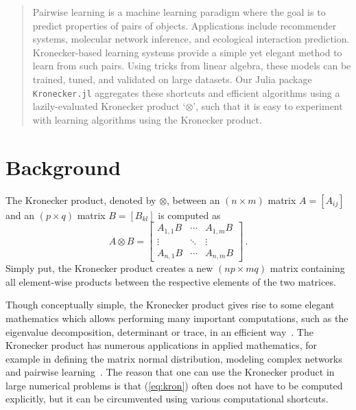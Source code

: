 \documentclass{juliacon}
\begin{document}


\maketitle

\begin{abstract}
Pairwise learning is a machine learning paradigm where the goal is to predict properties of pairs of objects.
Applications include recommender systems, molecular network inference, and ecological interaction prediction.
Kronecker-based learning systems provide a simple yet elegant method to learn from such pairs.
Using tricks from linear algebra, these models can be trained, tuned, and validated on large datasets.
Our Julia package \texttt{Kronecker.jl} aggregates these shortcuts and efficient algorithms using a lazily-evaluated Kronecker product `$\otimes$', such that it is easy to experiment with learning algorithms using the Kronecker product.

\end{abstract}

\section{Background}

The Kronecker product, denoted by $\otimes$, between an $(n\times m)$ matrix $A=[A_{ij}]$ and an $(p\times q)$ matrix $B=[B_{kl}]$ is computed as
\begin{equation}\label{eq:kron}
  {A} \otimes  {B} ={\begin{bmatrix}A_{1,1} {B} &\cdots &A_{1,m} {B} \\\vdots &\ddots &\vdots \\A_{n,1} {B} &\cdots &A_{n,m} {B} \end{bmatrix}}\,.
\end{equation}
Simply put, the Kronecker product creates a new $(np\times mq)$ matrix containing all element-wise products between the respective elements of the two matrices.

Though conceptually simple, the Kronecker product gives rise to some elegant mathematics which allows performing many important computations, such as the eigenvalue decomposition, determinant or trace, in an efficient way~\cite{Sch2013,VanLoan2000}.
The Kronecker product has numerous applications in applied mathematics, for example in defining the matrix normal distribution, modeling complex networks~\cite{Leskovec2008} and pairwise learning~\cite{Stock2017tskrr}.
The reason that one can use the Kronecker product in large numerical problems is that (\ref{eq:kron}) often does not have to be computed explicitly, but it can be circumvented using various computational shortcuts.
\end{document}
